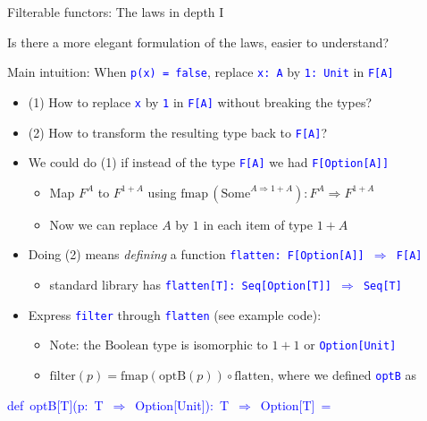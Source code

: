 \documentclass[english]{beamer}
\newenvironment{lyxcode}
   {\par\begin{list}{}{
     \setlength{\rightmargin}{\leftmargin}
     \setlength{\listparindent}{0pt}%
     \raggedright
     \setlength{\itemsep}{0pt}
     \setlength{\parsep}{0pt}
     \normalfont\ttfamily}%
    \def\{{\char`\{}
    \def\}{\char`\}}
    \def\textasciitilde{\char`\~}
    \item[]}
   {\end{list}}
\begin{document}
\begin{frame}{Filterable functors: The laws in depth I}

Is there a more elegant formulation of the laws, easier to understand?
\begin{itemize}
\item Main intuition: When \texttt{\textcolor{blue}{\footnotesize{}p(x)
= false}}, replace \texttt{\textcolor{blue}{\footnotesize{}x:\ A}}
by \texttt{\textcolor{blue}{\footnotesize{}1:\ Unit}} in \texttt{\textcolor{blue}{\footnotesize{}F{[}A{]}}} 
\begin{itemize}
\item (1) How to replace \texttt{\textcolor{blue}{\footnotesize{}x}} by
\texttt{\textcolor{blue}{\footnotesize{}1}} in \texttt{\textcolor{blue}{\footnotesize{}F{[}A{]}}}
without breaking the types?
\item (2) How to transform the resulting type back to \texttt{\textcolor{blue}{\footnotesize{}F{[}A{]}}}?
\item We could do (1) if instead of the type \texttt{\textcolor{blue}{\footnotesize{}F{[}A{]}}}
we had \texttt{\textcolor{blue}{\footnotesize{}F{[}Option{[}A{]}{]}}} 
\begin{itemize}
\item Map $F^{A}$ to $F^{1+A}$ using $\text{fmap}\,(\text{Some}^{A\Rightarrow1+A}):F^{A}\Rightarrow F^{1+A}$ 
\item Now we can replace $A$ by $1$ in each item of type $1+A$
\end{itemize}
\item Doing (2) means \emph{defining} a function \texttt{\textcolor{blue}{\footnotesize{}flatten:\ F{[}Option{[}A{]}{]}
$\Rightarrow$ F{[}A{]}}} 
\begin{itemize}
\item standard library has \texttt{\textcolor{blue}{\footnotesize{}flatten{[}T{]}:\ Seq{[}Option{[}T{]}{]}
$\Rightarrow$ Seq{[}T{]}}} 
\end{itemize}
\item Express \texttt{\textcolor{blue}{\footnotesize{}filter}} through \texttt{\textcolor{blue}{\footnotesize{}flatten}}
(see example code):
\begin{itemize}
\item Note: the $\text{Boolean}$ type is isomorphic to $1+1$ or \texttt{\textcolor{blue}{\footnotesize{}Option{[}Unit{]}}}{\footnotesize \par}
\item $\text{filter}\left(p\right)=\text{fmap}\left(\text{optB}(p)\right)\circ\text{flatten}$,
where we defined \texttt{\textcolor{blue}{\footnotesize{}optB}} as
\end{itemize}
\end{itemize}
\begin{lyxcode}
\textcolor{blue}{\footnotesize{}def~optB{[}T{]}(p:~T~$\Rightarrow$~Option{[}Unit{]}):~T~$\Rightarrow$~Option{[}T{]}~=}{\footnotesize \par}


\end{lyxcode}
\end{itemize}
\end{frame}
\end{document}
